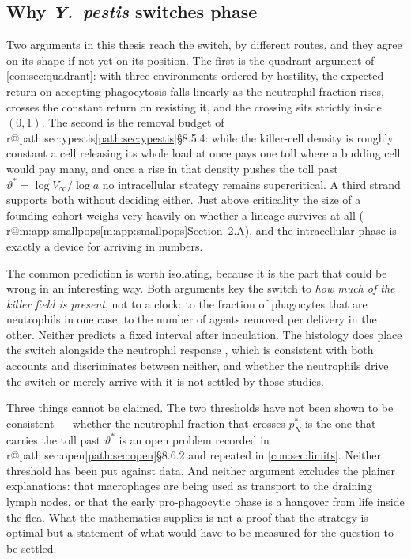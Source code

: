 \documentclass[11pt,a4paper]{report}
\makeatletter
\newcommand{\yp}{\textit{Y.~pestis}}
\providecommand{\mextref}[2]{%
  \ifcsname r@#1\endcsname\cref{#1}\else#2\fi}
\theoremstyle{plain}
\theoremstyle{remark}
\makeatother
\begin{document}
\subsection{Why \texorpdfstring{\yp{}}{Y. pestis} switches phase}
\label{con:sec:q1}

Two arguments in this thesis reach the switch, by different routes, and they
agree on its shape if not yet on its position. The first is the quadrant
argument of \cref{con:sec:quadrant}: with three environments ordered by
hostility, the expected return on accepting phagocytosis falls linearly as
the neutrophil fraction rises, crosses the constant return on resisting it,
and the crossing sits strictly inside $(0,1)$. The second is the removal
budget of \mextref{path:sec:ypestis}{\S8.5.4}: while the killer-cell density
is roughly constant a cell releasing its whole load at once pays one toll
where a budding cell would pay many, and once a rise in that density pushes
the toll past $\vartheta^{\ast}=\log V_\infty/\log a$ no intracellular
strategy remains supercritical. A third strand supports both without
deciding either. Just above criticality the size of a founding cohort weighs
very heavily on whether a lineage survives at all
(\mextref{m:app:smallpops}{Section~2.A}), and the intracellular phase is
exactly a device for arriving in numbers.

The common prediction is worth isolating, because it is the part that could
be wrong in an interesting way. Both arguments key the switch to \emph{how
much of the killer field is present}, not to a clock: to the fraction of
phagocytes that are neutrophils in one case, to the number of agents removed
per delivery in the other. Neither predicts a fixed interval after inoculation. The histology
does place the switch alongside the neutrophil response
\cite{BosioEtAl2005,PetersEtAl2013}, which is consistent with both accounts
and discriminates between neither, and whether the neutrophils drive the
switch or merely arrive with it is not settled by those studies.

Three things cannot be claimed. The two thresholds have not been shown to be
consistent --- whether the neutrophil fraction that crosses $p_N^{\ast}$ is
the one that carries the toll past $\vartheta^{\ast}$ is an open problem
recorded in \mextref{path:sec:open}{\S8.6.2} and repeated in
\cref{con:sec:limits}. Neither threshold has been put against data. And
neither argument excludes the plainer explanations: that macrophages are
being used as transport to the draining lymph nodes, or that the early
pro-phagocytic phase is a hangover from life inside the flea. What the
mathematics supplies is not a proof that the strategy is optimal but a
statement of what would have to be measured for the question to be settled.
\end{document}
